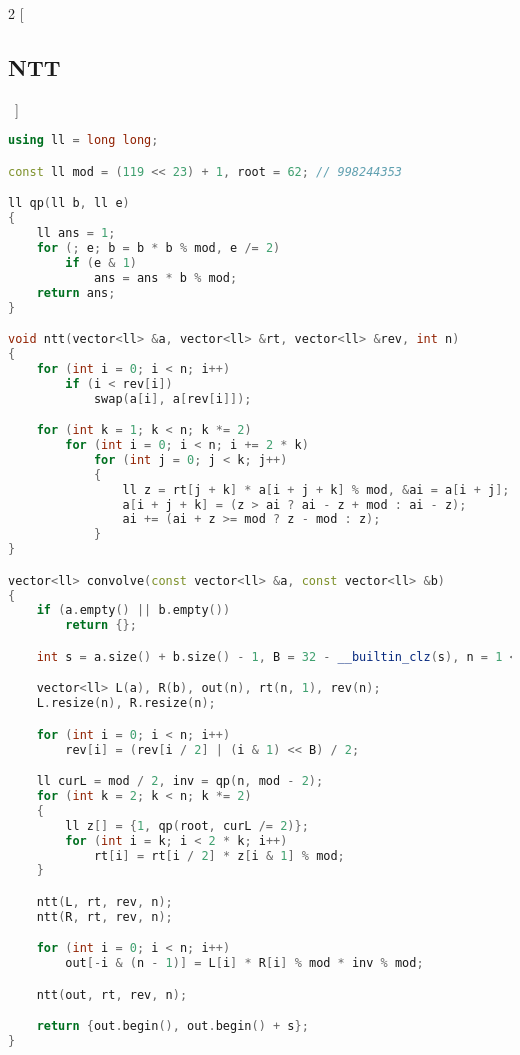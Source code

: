 \documentclass[leter]{amsart}
\begin{document}
\begin{multicols}{2}
[\subsection{NTT}\ ]
\begin{lstlisting}[language=C++]
using ll = long long;

const ll mod = (119 << 23) + 1, root = 62; // 998244353

ll qp(ll b, ll e)
{
    ll ans = 1;
    for (; e; b = b * b % mod, e /= 2)
        if (e & 1)
            ans = ans * b % mod;
    return ans;
}

void ntt(vector<ll> &a, vector<ll> &rt, vector<ll> &rev, int n)
{
    for (int i = 0; i < n; i++)
        if (i < rev[i])
            swap(a[i], a[rev[i]]);

    for (int k = 1; k < n; k *= 2)
        for (int i = 0; i < n; i += 2 * k)
            for (int j = 0; j < k; j++)
            {
                ll z = rt[j + k] * a[i + j + k] % mod, &ai = a[i + j];
                a[i + j + k] = (z > ai ? ai - z + mod : ai - z);
                ai += (ai + z >= mod ? z - mod : z);
            }
}

vector<ll> convolve(const vector<ll> &a, const vector<ll> &b)
{
    if (a.empty() || b.empty())
        return {};

    int s = a.size() + b.size() - 1, B = 32 - __builtin_clz(s), n = 1 << B;

    vector<ll> L(a), R(b), out(n), rt(n, 1), rev(n);
    L.resize(n), R.resize(n);

    for (int i = 0; i < n; i++)
        rev[i] = (rev[i / 2] | (i & 1) << B) / 2;

    ll curL = mod / 2, inv = qp(n, mod - 2);
    for (int k = 2; k < n; k *= 2)
    {
        ll z[] = {1, qp(root, curL /= 2)};
        for (int i = k; i < 2 * k; i++)
            rt[i] = rt[i / 2] * z[i & 1] % mod;
    }

    ntt(L, rt, rev, n);
    ntt(R, rt, rev, n);

    for (int i = 0; i < n; i++)
        out[-i & (n - 1)] = L[i] * R[i] % mod * inv % mod;

    ntt(out, rt, rev, n);

    return {out.begin(), out.begin() + s};
}


\end{lstlisting}
\end{multicols}
\end{document}
